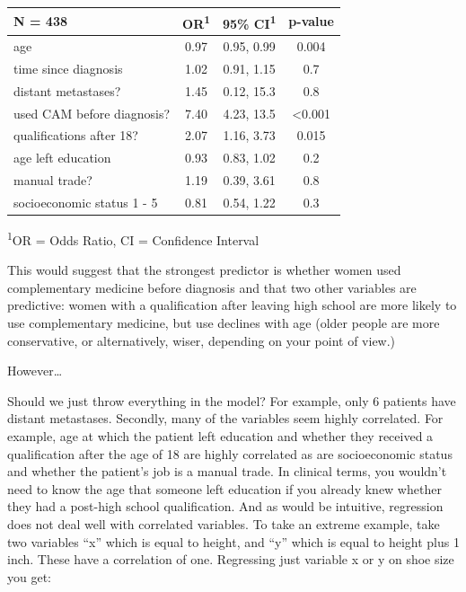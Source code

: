 \documentclass[]{book}
\begin{document}
\captionsetup[table]{labelformat=empty,skip=1pt}
\begin{longtable}{lccc}
\toprule
\textbf{N = 438} & \textbf{OR}\textsuperscript{1} & \textbf{95\% CI}\textsuperscript{1} & \textbf{p-value} \\ 
\midrule
age & 0.97 & 0.95, 0.99 & 0.004 \\ 
time since diagnosis & 1.02 & 0.91, 1.15 & 0.7 \\ 
distant metastases? & 1.45 & 0.12, 15.3 & 0.8 \\ 
used CAM before diagnosis? & 7.40 & 4.23, 13.5 & <0.001 \\ 
qualifications after 18? & 2.07 & 1.16, 3.73 & 0.015 \\ 
age left education & 0.93 & 0.83, 1.02 & 0.2 \\ 
manual trade? & 1.19 & 0.39, 3.61 & 0.8 \\ 
socioeconomic status 1 - 5 & 0.81 & 0.54, 1.22 & 0.3 \\ 
\bottomrule
\end{longtable}
\vspace{-5mm}
\begin{minipage}{\linewidth}
\textsuperscript{1}OR = Odds Ratio, CI = Confidence Interval \\ 
\end{minipage}

This would suggest that the strongest predictor is whether women used complementary medicine before diagnosis and that two other variables are predictive: women with a qualification after leaving high school are more likely to use complementary medicine, but use declines with age (older people are more conservative, or alternatively, wiser, depending on your point of view.)

However\ldots{}

Should we just throw everything in the model? For example, only 6 patients have distant metastases. Secondly, many of the variables seem highly correlated. For example, age at which the patient left education and whether they received a qualification after the age of 18 are highly correlated as are socioeconomic status and whether the patient's job is a manual trade. In clinical terms, you wouldn't need to know the age that someone left education if you already knew whether they had a post-high school qualification. And as would be intuitive, regression does not deal well with correlated variables. To take an extreme example, take two variables ``x'' which is equal to height, and ``y'' which is equal to height plus 1 inch. These have a correlation of one. Regressing just variable x or y on shoe size you get:
\end{document}
